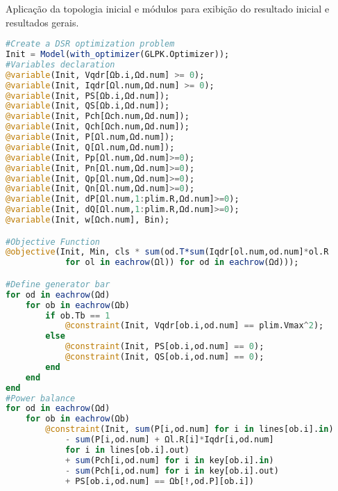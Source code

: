 Aplicação da topologia inicial e módulos para exibição do resultado inicial e resultados gerais.

\begin{lstlisting}[language = Julia, firstnumber = 208]
#Create a DSR optimization problem
Init = Model(with_optimizer(GLPK.Optimizer));
#Variables declaration
@variable(Init, Vqdr[Ωb.i,Ωd.num] >= 0);
@variable(Init, Iqdr[Ωl.num,Ωd.num] >= 0);
@variable(Init, PS[Ωb.i,Ωd.num]);
@variable(Init, QS[Ωb.i,Ωd.num]);
@variable(Init, Pch[Ωch.num,Ωd.num]);
@variable(Init, Qch[Ωch.num,Ωd.num]);
@variable(Init, P[Ωl.num,Ωd.num]);
@variable(Init, Q[Ωl.num,Ωd.num]);
@variable(Init, Pp[Ωl.num,Ωd.num]>=0);
@variable(Init, Pn[Ωl.num,Ωd.num]>=0);
@variable(Init, Qp[Ωl.num,Ωd.num]>=0);
@variable(Init, Qn[Ωl.num,Ωd.num]>=0);
@variable(Init, dP[Ωl.num,1:plim.R,Ωd.num]>=0);
@variable(Init, dQ[Ωl.num,1:plim.R,Ωd.num]>=0);
@variable(Init, w[Ωch.num], Bin);

#Objective Function
@objective(Init, Min, cls * sum(od.T*sum(Iqdr[ol.num,od.num]*ol.R 
            for ol in eachrow(Ωl)) for od in eachrow(Ωd)));

#Define generator bar  
for od in eachrow(Ωd)    
    for ob in eachrow(Ωb)
        if ob.Tb == 1
            @constraint(Init, Vqdr[ob.i,od.num] == plim.Vmax^2);
        else
            @constraint(Init, PS[ob.i,od.num] == 0);
            @constraint(Init, QS[ob.i,od.num] == 0);
        end
    end
end
#Power balance
for od in eachrow(Ωd)    
    for ob in eachrow(Ωb)
        @constraint(Init, sum(P[i,od.num] for i in lines[ob.i].in) 
            - sum(P[i,od.num] + Ωl.R[i]*Iqdr[i,od.num] 
            for i in lines[ob.i].out)
            + sum(Pch[i,od.num] for i in key[ob.i].in)
            - sum(Pch[i,od.num] for i in key[ob.i].out)
            + PS[ob.i,od.num] == Ωb[!,od.P][ob.i])


\end{lstlisting}
